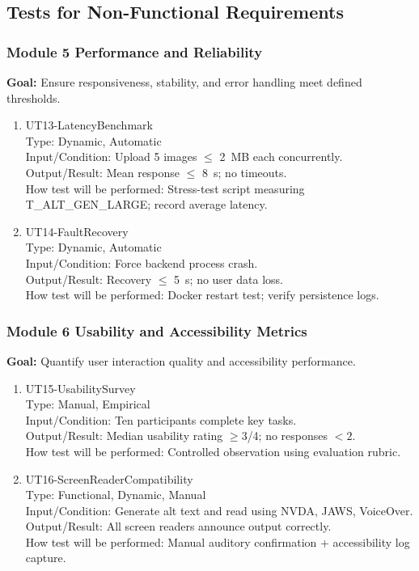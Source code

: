 \documentclass[12pt, titlepage]{article}
\begin{document}
\subsection{Tests for Non-Functional Requirements}

\subsubsection{Module 5 \textemdash{} Performance and Reliability}

\textbf{Goal:} Ensure responsiveness, stability, and error handling
meet defined thresholds.

\begin{enumerate}
  \item{UT13-LatencyBenchmark\\}
    Type: Dynamic, Automatic\\
    Input/Condition: Upload 5 images $\leq$ 2~MB each concurrently.\\
    Output/Result: Mean response $\leq$ 8~s; no timeouts.\\
    How test will be performed: Stress-test script measuring
    T\_ALT\_GEN\_LARGE; record average latency.

  \item{UT14-FaultRecovery\\}
    Type: Dynamic, Automatic\\
    Input/Condition: Force backend process crash.\\
    Output/Result: Recovery $\leq$ 5~s; no user data loss.\\
    How test will be performed: Docker restart test; verify persistence logs.
\end{enumerate}

\subsubsection{Module 6 \textemdash{} Usability and Accessibility Metrics}

\textbf{Goal:} Quantify user interaction quality and accessibility performance.

\begin{enumerate}
  \item{UT15-UsabilitySurvey\\}
    Type: Manual, Empirical\\
    Input/Condition: Ten participants complete key tasks.\\
    Output/Result: Median usability rating $\geq 3$/4; no responses $<2$.\\
    How test will be performed: Controlled observation using evaluation rubric.

  \item{UT16-ScreenReaderCompatibility\\}
    Type: Functional, Dynamic, Manual\\
    Input/Condition: Generate alt text and read using NVDA, JAWS, VoiceOver.\\
    Output/Result: All screen readers announce output correctly.\\
    How test will be performed: Manual auditory confirmation +
    accessibility log capture.
\end{enumerate}
\end{document}
